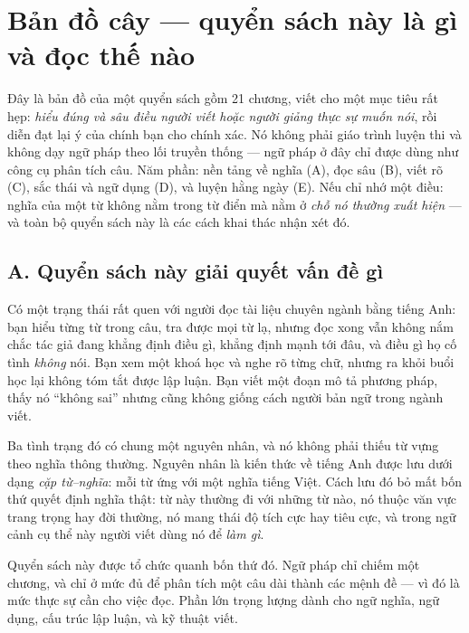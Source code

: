 \documentclass[english.tex]{subfiles}
\begin{document}
\chapter*{Bản đồ cây --- quyển sách này là gì và đọc thế nào}

\begin{tomtat}
Đây là bản đồ của một quyển sách gồm 21 chương, viết cho một mục tiêu rất hẹp: \emph{hiểu đúng và sâu điều người viết hoặc người giảng thực sự muốn nói}, rồi diễn đạt lại ý của chính bạn cho chính xác. Nó không phải giáo trình luyện thi và không dạy ngữ pháp theo lối truyền thống --- ngữ pháp ở đây chỉ được dùng như công cụ phân tích câu. Năm phần: nền tảng về nghĩa (A), đọc sâu (B), viết rõ (C), sắc thái và ngữ dụng (D), và luyện hằng ngày (E). Nếu chỉ nhớ một điều: nghĩa của một từ không nằm trong từ điển mà nằm ở \emph{chỗ nó thường xuất hiện} --- và toàn bộ quyển sách này là các cách khai thác nhận xét đó.
\end{tomtat}

\section*{A. Quyển sách này giải quyết vấn đề gì}

Có một trạng thái rất quen với người đọc tài liệu chuyên ngành bằng tiếng Anh: bạn hiểu từng từ trong câu, tra được mọi từ lạ, nhưng đọc xong vẫn không nắm chắc tác giả đang khẳng định điều gì, khẳng định mạnh tới đâu, và điều gì họ cố tình \emph{không} nói. Bạn xem một khoá học và nghe rõ từng chữ, nhưng ra khỏi buổi học lại không tóm tắt được lập luận. Bạn viết một đoạn mô tả phương pháp, thấy nó ``không sai'' nhưng cũng không giống cách người bản ngữ trong ngành viết.

Ba tình trạng đó có chung một nguyên nhân, và nó không phải thiếu từ vựng theo nghĩa thông thường. Nguyên nhân là kiến thức về tiếng Anh được lưu dưới dạng \emph{cặp từ--nghĩa}: mỗi từ ứng với một nghĩa tiếng Việt. Cách lưu đó bỏ mất bốn thứ quyết định nghĩa thật: từ này thường đi với những từ nào, nó thuộc văn vực trang trọng hay đời thường, nó mang thái độ tích cực hay tiêu cực, và trong ngữ cảnh cụ thể này người viết dùng nó để \emph{làm gì}.

Quyển sách này được tổ chức quanh bốn thứ đó. Ngữ pháp chỉ chiếm một chương, và chỉ ở mức đủ để phân tích một câu dài thành các mệnh đề --- vì đó là mức thực sự cần cho việc đọc. Phần lớn trọng lượng dành cho ngữ nghĩa, ngữ dụng, cấu trúc lập luận, và kỹ thuật viết.
\end{document}

